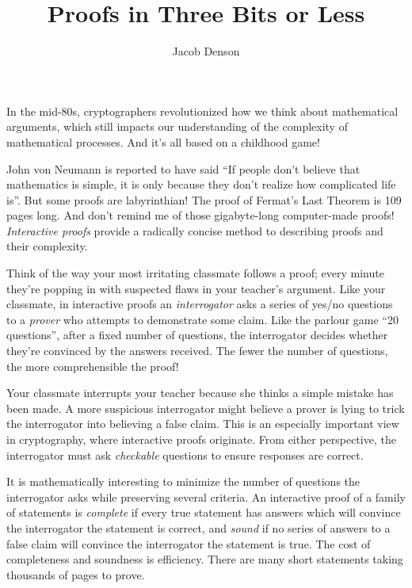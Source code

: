 \documentclass{article}
\title{Proofs in Three Bits or Less}
\author{Jacob Denson}
\theoremstyle{plain}
\theoremstyle{remark}
\theoremstyle{definition}
\begin{document}
\maketitle

\pagecolor{beige}

{\Large In the mid-80s, cryptographers revolutionized how we think about mathematical arguments, which still impacts our understanding of the complexity of mathematical processes. And it's all based on a childhood game!}

\begin{multicols}{2}

John von Neumann is reported to have said ``If people don't believe that mathematics is simple, it is only because they don't realize how complicated life is''. But some proofs are labyrinthian! The proof of Fermat's Last Theorem is 109 pages long. And don't remind me of those gigabyte-long computer-made proofs! {\it Interactive proofs} provide a radically concise method to describing proofs and their complexity.

Think of the way your most irritating classmate follows a proof; every minute they're popping in with suspected flaws in your teacher's argument. Like your classmate, in interactive proofs an {\it interrogator} asks a series of yes/no questions to a {\it prover} who attempts to demonstrate some claim. Like the parlour game ``20 questions'', after a fixed number of questions, the interrogator decides whether they're convinced by the answers received. The fewer the number of questions, the more comprehensible the proof!

Your classmate interrupts your teacher because she thinks a simple mistake has been made. A more suspicious interrogator might believe a prover is lying to trick the interrogator into believing a false claim. This is an especially important view in cryptography, where interactive proofs originate. From either perspective, the interrogator must ask {\it checkable} questions to ensure responses are correct.

It is mathematically interesting to minimize the number of questions the interrogator asks while preserving several criteria. An interactive proof of a family of statements is {\it complete} if every true statement has answers which will convince the interrogator the statement is correct, and {\it sound} if no series of answers to a false claim will convince the interrogator the statement is true. The cost of completeness and soundness is efficiency. There are many short statements taking thousands of pages to prove.


\end{multicols}
\end{document}
